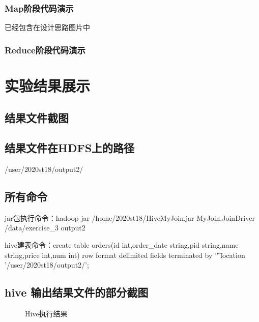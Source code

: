 \documentclass[a4paper,UTF8]{article}
\numberwithin{equation}{section}
\begin{document}
\subsubsection{Map阶段代码演示}
已经包含在设计思路图片中

\subsubsection{Reduce阶段代码演示}

\section{实验结果展示}
\subsection{结果文件截图}

\subsection{结果文件在HDFS上的路径}
/user/2020st18/output2/
\subsection{所有命令}
jar包执行命令：hadoop jar /home/2020st18/HiveMyJoin.jar MyJoin.JoinDriver /data/exercise\_3 output2 

hive建表命令：create table orders(id int,order\_date string,pid string,name string,price int,num int) row format delimited fields terminated by '\t' location '/user/2020st18/output2/';
\subsection{hive 输出结果文件的部分截图}
\begin{figure}[H]
	\centering
	\vfill
	
	\caption{Hive执行结果}
\end{figure}
\end{document}
